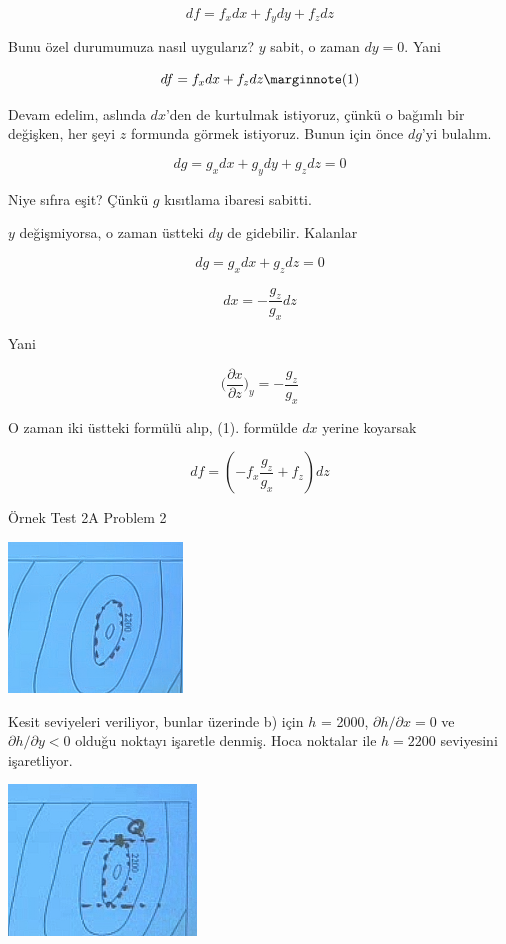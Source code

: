 \documentclass[12pt,fleqn]{article}\usepackage{../../common}
\begin{document}
$$ df = f_xdx + f_ydy + f_zdz $$  

Bunu özel durumumuza nasıl uygularız? $y$ sabit, o zaman $dy = 0$. Yani

$$
df = f_xdx + f_zdz  
\mlabel{1}
$$

Devam edelim, aslında $dx$'den de kurtulmak istiyoruz, çünkü o bağımlı bir
değişken, her şeyi $z$ formunda görmek istiyoruz. Bunun için önce $dg$'yi
bulalım. 

$$ dg = g_xdx + g_ydy + g_zdz = 0   $$

Niye sıfıra eşit? Çünkü $g$ kısıtlama ibaresi sabitti. 

$y$ değişmiyorsa, o zaman üstteki $dy$ de gidebilir. Kalanlar

$$ dg = g_xdx + g_zdz = 0  $$

$$ dx = -\frac{g_z}{g_x}dz $$

Yani 

$$ 
\bigg( \frac{\partial x}{\partial z}\bigg)_{y} = -\frac{g_z}{g_x}
$$

O zaman iki üstteki formülü alıp, (1). formülde $dx$ yerine 
koyarsak

$$ df = (-f_x\frac{g_z}{g_x} +  f_z) dz $$

Örnek Test 2A Problem 2

\begin{center}
\includegraphics[height=4cm]{15_2.png}
\end{center}

Kesit seviyeleri veriliyor, bunlar üzerinde b) için $h$ = 2000, $\partial
h/\partial x = 0$ ve $\partial h/\partial y < 0$ olduğu noktayı işaretle
denmiş. Hoca noktalar ile $h=2200$ seviyesini işaretliyor.

\begin{center}
\includegraphics[height=4cm]{15_3.png}
\end{center}
\end{document}
